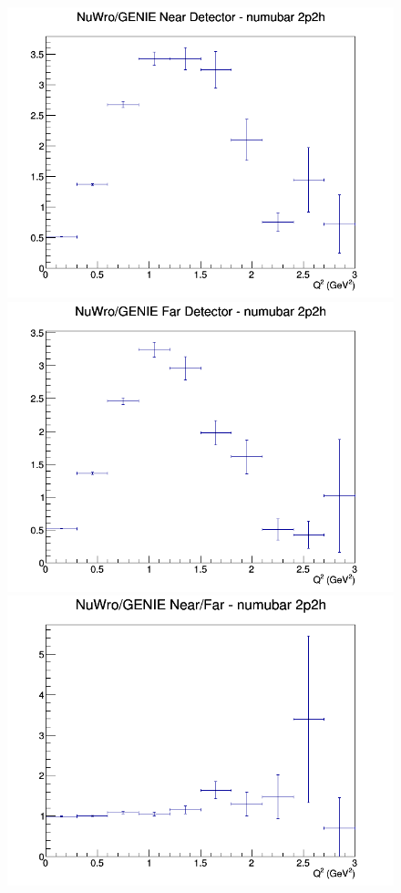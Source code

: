 \documentclass[12pt]{article}
\begin{document}
\begin{figure}[h]
\endminipage
\newline
{}
\includegraphics[width=\linewidth]{Q2/nominal/ratios/2p2h_NuWro_GENIE_numubar_near_Q2.png}
\endminipage
{}
\includegraphics[width=\linewidth]{Q2/nominal/ratios/2p2h_NuWro_GENIE_numubar_far_Q2.png}
\endminipage
{}
\includegraphics[width=\linewidth]{Q2/nominal/ratios/2p2h_NuWro_GENIE_numubar_NF_Q2.png}

\end{figure}
\end{document}
